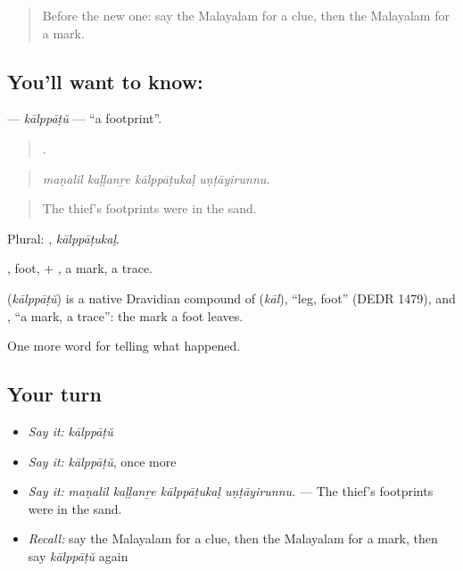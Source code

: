 \label{lesson:ML-C366-kalppatu}



\begin{quote}
Before the new one: say the Malayalam for a clue, then the Malayalam for a mark.
\end{quote}

\subsection*{You'll want to know: }
\textbf{} — \emph{kālppāṭŭ} — \textquotedblleft{}a footprint\textquotedblright{}.

\begin{quote}
   .
\end{quote}

\begin{quote}
\emph{maṇalil kaḷḷanṟe kālppāṭukaḷ uṇṭāyirunnu.}
\end{quote}

\begin{quote}
The thief's footprints were in the sand.
\end{quote}

Plural: , \emph{kālppāṭukaḷ}.

, foot, + , a mark, a trace.

\begin{cousinweb}
\textbf{} (\emph{kālppāṭŭ}) is a native Dravidian compound of  (\emph{kāl}), \textquotedblleft{}leg, foot\textquotedblright{} (DEDR 1479), and , \textquotedblleft{}a mark, a trace\textquotedblright{}: the mark a foot leaves.
\end{cousinweb}

\begin{grammarlens}[title={What you've built}]
One more word for telling what happened.
\end{grammarlens}

\subsection*{Your turn}
\begin{itemize}
\raggedright
  \item \emph{Say it:} \emph{kālppāṭŭ}
  \item \emph{Say it:} \emph{kālppāṭŭ}, once more
  \item \emph{Say it:} \emph{maṇalil kaḷḷanṟe kālppāṭukaḷ uṇṭāyirunnu.} — The thief's footprints were in the sand.
  \item \emph{Recall:} say the Malayalam for a clue, then the Malayalam for a mark, then say \emph{kālppāṭŭ} again
\end{itemize}

